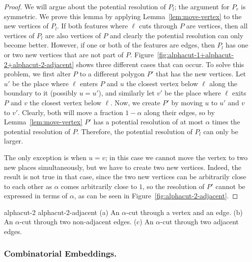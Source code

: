\documentclass[11pt]{article}
\renewcommand{\subsection}[1]{\subsubsection{#1.}}
\begin{document}
    \begin {proof}
      We will argue about the potential resolution of $P_l$; the argument for $P_r
      $ is symmetric.
      We prove this lemma by applying Lemma~\ref {lem:move-vertex} to the
      new vertices of $P_l$. If both features where $\ell$ cuts through $P$ are
      vertices, then all vertices of $P_l$ are also vertices of $P$ and clearly
      the potential resolution can only become better. However, if one or both of
      the features are edges, then $P_l$ has one or two new vertices that are not
      part of $P$.
      Figure~\ref {fig:alphacut-1+alphacut-2+alphacut-2-adjacent} shows three different cases that can occur.
      To solve this problem, we first alter $P$ to a different
      polygon $P'$ that has the new vertices. Let $u'$ be the place where $\ell$
      enters $P$ and $u$ the closest vertex below $\ell$ along the boundary to it
      (possibly $u = u'$), and similarly let $v'$ be the place where $\ell$ exits
      $P$ and $v$ the closest vertex below $\ell$. Now, we create $P'$ by moving
      $u$ to $u'$ and $v$ to $v'$. Clearly, both will move a fraction $1 - \alpha$
      along their edges, so by Lemma~\ref {lem:move-vertex} $P'$ has a potential
      resolution of at most $\alpha$ times the potential resolution of $P$.
      Therefore, the potential resolution of $P_l$ can only be larger.

      The only exception is when $u = v$; in this case we cannot move the vertex
      to two new places simultaneously, but we have to create two new vertices.
      Indeed, the result is not true in that case, since the two new vertices
      can be arbitrarily close to each other as $\alpha$ comes arbitrarily
      close to $1$, so the resolution of $P'$ cannot be expressed in terms of
      $\alpha$, as can be seen in Figure~\ref {fig:alphacut-2-adjacent}.
    \end {proof}

     {alphacut-2} {alphacut-2-adjacent}
    {(a) An $\alpha$-cut through a vertex and an edge. (b) An $\alpha$-cut through two non-adjacent
    edges. (c) An $\alpha$-cut through two adjacent edges.}

  \subsection {Combinatorial Embeddings}
\end{document}
